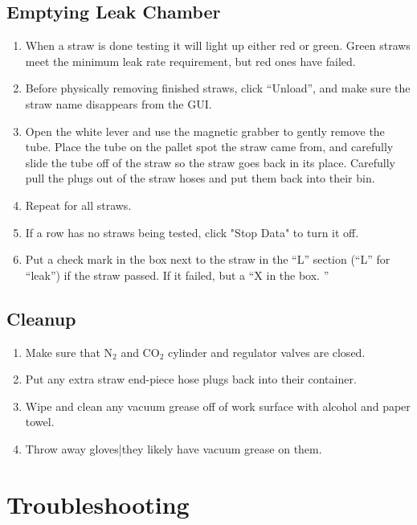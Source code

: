 \documentclass[A4,12pt]{article}
\begin{document}
\subsection{Emptying Leak Chamber}
	\begin{enumerate}
		\item When a straw is done testing it will light up either red or green.  Green straws meet the minimum leak rate requirement, but red ones have failed.  
	\item Before physically removing finished straws, click ``Unload'', and make sure the straw name disappears from the GUI.  
	\item Open the white lever and use the magnetic grabber to gently remove the tube. Place the tube on the pallet spot the straw came from, and carefully slide the tube off of the straw so the straw goes back in its place. Carefully pull the plugs out of the straw hoses and put them back into their bin.
	\item Repeat for all straws.
	\item If a row has no straws being tested, click "Stop Data" to turn it off.
	\item Put a check mark in the box next to the straw in the ``L'' section (``L'' for ``leak'') if the straw passed. If it failed, but a ``X in the box.
	''
\end{enumerate}

\subsection{Cleanup}
	\begin{enumerate}
		\item Make sure that N$_2$ and CO$_2$ cylinder and regulator valves are closed.
		\item Put any extra straw end-piece hose plugs back into their container.
		\item Wipe and clean any vacuum grease off of work surface with alcohol and paper towel.
		\item Throw away gloves|they likely have vacuum grease on them.
	\end{enumerate}



\section{Troubleshooting}
\end{document}
